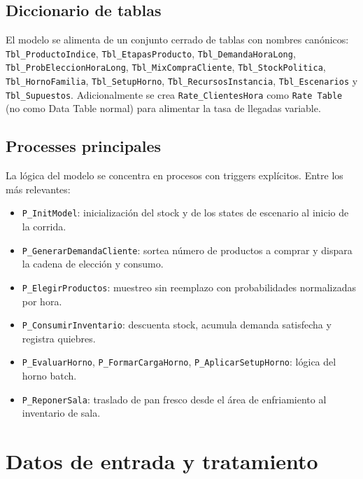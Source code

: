 \documentclass[12pt]{article}
\begin{document}
\subsection{Diccionario de tablas}

El modelo se alimenta de un conjunto cerrado de tablas con nombres canónicos: \texttt{Tbl\_ProductoIndice}, \texttt{Tbl\_EtapasProducto}, \texttt{Tbl\_DemandaHoraLong}, \texttt{Tbl\_ProbEleccionHoraLong}, \texttt{Tbl\_MixCompraCliente}, \texttt{Tbl\_StockPolitica}, \texttt{Tbl\_HornoFamilia}, \texttt{Tbl\_SetupHorno}, \texttt{Tbl\_RecursosInstancia}, \texttt{Tbl\_Escenarios} y \texttt{Tbl\_Supuestos}. Adicionalmente se crea \texttt{Rate\_ClientesHora} como \texttt{Rate Table} (no como Data Table normal) para alimentar la tasa de llegadas variable.

\subsection{Processes principales}

La lógica del modelo se concentra en procesos con triggers explícitos. Entre los más relevantes:

\begin{itemize}
  \item \texttt{P\_InitModel}: inicialización del stock y de los states de escenario al inicio de la corrida.
  \item \texttt{P\_GenerarDemandaCliente}: sortea número de productos a comprar y dispara la cadena de elección y consumo.
  \item \texttt{P\_ElegirProductos}: muestreo sin reemplazo con probabilidades normalizadas por hora.
  \item \texttt{P\_ConsumirInventario}: descuenta stock, acumula demanda satisfecha y registra quiebres.
  \item \texttt{P\_EvaluarHorno}, \texttt{P\_FormarCargaHorno}, \texttt{P\_AplicarSetupHorno}: lógica del horno batch.
  \item \texttt{P\_ReponerSala}: traslado de pan fresco desde el área de enfriamiento al inventario de sala.
\end{itemize}

\newpage
\section{Datos de entrada y tratamiento}
\end{document}
